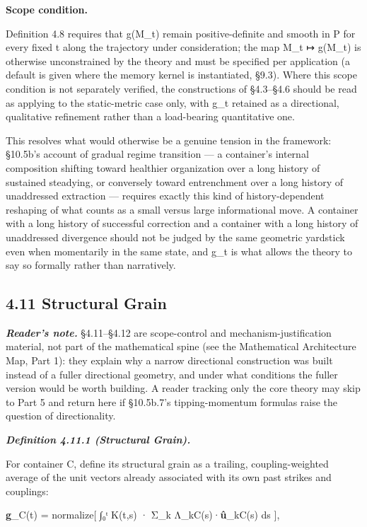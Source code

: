 \documentclass[
]{article}
\begin{document}
\textbf{Scope condition.}

Definition 4.8 requires that g(M\_t) remain positive-definite and smooth
in P for every fixed t along the trajectory under consideration; the map
M\_t ↦ g(M\_t) is otherwise unconstrained by the theory and must be
specified per application (a default is given where the memory kernel is
instantiated, §9.3). Where this scope condition is not separately
verified, the constructions of §4.3--§4.6 should be read as applying to
the static-metric case only, with g\_t retained as a directional,
qualitative refinement rather than a load-bearing quantitative one.

This resolves what would otherwise be a genuine tension in the
framework: §10.5b's account of gradual regime transition --- a container's
internal composition shifting toward healthier organization over a long
history of sustained steadying, or conversely toward entrenchment over a
long history of unaddressed extraction --- requires exactly this kind of
history-dependent reshaping of what counts as a small versus large
informational move. A container with a long history of successful
correction and a container with a long history of unaddressed divergence
should not be judged by the same geometric yardstick even when
momentarily in the same state, and g\_t is what allows the theory to say
so formally rather than narratively.

\hypertarget{structural-grain}{%
\subsection{4.11 Structural Grain}\label{structural-grain}}

\emph{\textbf{Reader's note.}} §4.11--§4.12 are scope-control and
mechanism-justification material, not part of the mathematical spine
(see the Mathematical Architecture Map, Part 1): they explain why a
narrow directional construction was built instead of a fuller
directional geometry, and under what conditions the fuller version would
be worth building. A reader tracking only the core theory may skip to
Part 5 and return here if §10.5b.7's tipping-momentum formulas raise the
question of directionality.

\emph{\textbf{Definition 4.11.1 (Structural Grain).}}

For container C, define its structural grain as a trailing,
coupling-weighted average of the unit vectors already associated with
its own past strikes and couplings:

\textbf{g}\_C(t) = normalize{[} ∫₀ᵗ K(t,s) · Σ\_k
Λ\_kC(s)·\textbf{û}\_kC(s) ds {]},
\end{document}
